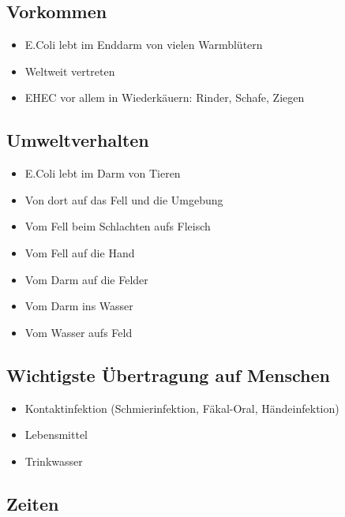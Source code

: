 \documentclass[
]{article}
\providecommand{\tightlist}{%
  \setlength{\itemsep}{0pt}\setlength{\parskip}{0pt}}
\begin{document}
\hypertarget{vorkommen}{%
\subsection{Vorkommen}\label{vorkommen}}

\begin{itemize}
\tightlist
\item
  E.Coli lebt im Enddarm von vielen Warmblütern
\item
  Weltweit vertreten
\item
  EHEC vor allem in Wiederkäuern: Rinder, Schafe, Ziegen
\end{itemize}

\hypertarget{umweltverhalten}{%
\subsection{Umweltverhalten}\label{umweltverhalten}}

\begin{itemize}
\tightlist
\item
  E.Coli lebt im Darm von Tieren
\item
  Von dort auf das Fell und die Umgebung
\item
  Vom Fell beim Schlachten aufs Fleisch
\item
  Vom Fell auf die Hand
\item
  Vom Darm auf die Felder
\item
  Vom Darm ins Wasser
\item
  Vom Wasser aufs Feld
\end{itemize}

\hypertarget{wichtigste-uxfcbertragung-auf-menschen}{%
\subsection{Wichtigste Übertragung auf
Menschen}\label{wichtigste-uxfcbertragung-auf-menschen}}

\begin{itemize}
\tightlist
\item
  Kontaktinfektion (Schmierinfektion, Fäkal-Oral, Händeinfektion)
\item
  Lebensmittel
\item
  Trinkwasser
\end{itemize}

\hypertarget{zeiten}{%
\subsection{Zeiten}\label{zeiten}}
\end{document}
